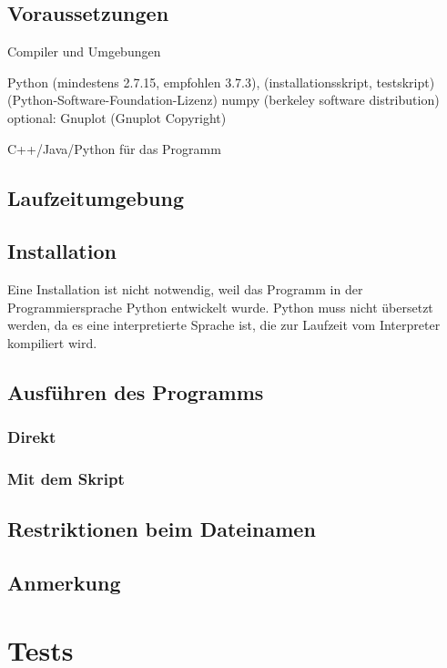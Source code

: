 \documentclass[a4paper,11pt]{article}
\begin{document}
{\subsection{Voraussetzungen}

Compiler und Umgebungen

Python (mindestens 2.7.15, empfohlen 3.7.3), (installationsskript, testskript) (Python-Software-Foundation-Lizenz)
numpy (berkeley software distribution)
optional: Gnuplot (Gnuplot Copyright)

C++/Java/Python für das Programm


\subsection{Laufzeitumgebung}

\subsection{Installation}

Eine Installation ist nicht notwendig, weil das Programm in der Programmiersprache Python entwickelt wurde. Python muss nicht übersetzt werden, da es eine interpretierte Sprache ist, die zur Laufzeit vom Interpreter kompiliert wird.

\subsection{Ausführen des Programms}

\subsubsection{Direkt}

\subsubsection{Mit dem Skript}

\subsection{Restriktionen beim Dateinamen}

\subsection{Anmerkung}

\section{Tests}

}
\end{document}
